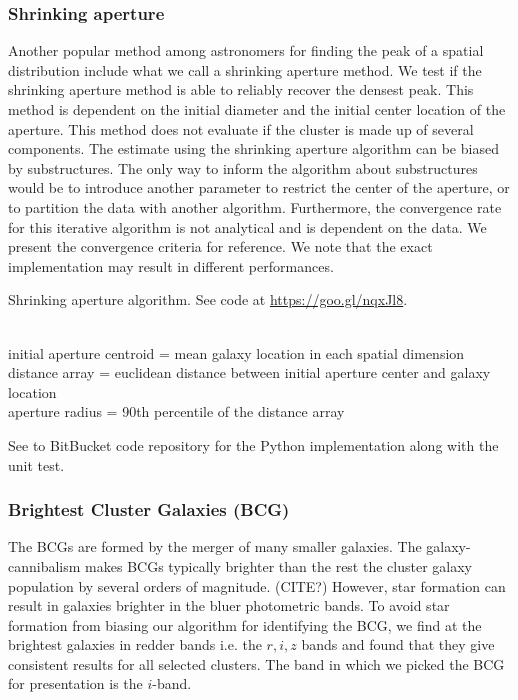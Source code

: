 \subsubsection{Shrinking aperture}
Another popular method among astronomers for finding the peak of a spatial
distribution include what we call a shrinking aperture method.
We test if the shrinking aperture method is able to reliably recover the 
densest peak.
This method is dependent on the initial diameter and the initial center 
location of the aperture.
This method does not evaluate if the cluster is made up of
several components.
The estimate using the shrinking aperture algorithm can be biased by
substructures. The only way to inform the algorithm about substructures would
be to introduce another parameter to restrict the center of the aperture, or to
partition the data with another algorithm.
Furthermore, the convergence rate for this iterative algorithm is not
analytical and is dependent on the data. We present the
convergence criteria for reference. 
We note that the exact implementation may result in different performances.
\begin{algorithm}
	\caption{Shrinking aperture algorithm. See code at
		\href{https://goo.gl/nqxJl8}{https://goo.gl/nqxJl8}.
	}
	 \hrulefill \\

	 initial aperture centroid = mean galaxy location in each spatial dimension\\
 	distance array = euclidean distance between initial aperture center and galaxy
	location \\
 	aperture radius = 90th percentile of the distance array\\ 
	   \hrulefill
 \end{algorithm}
 See to BitBucket code repository for the Python implementation
 along with the unit test.


\subsubsection{Brightest Cluster Galaxies (BCG)}
The BCGs are formed by the merger of many smaller
galaxies. The galaxy-cannibalism makes BCGs typically brighter than the rest 
the cluster galaxy population by several orders of magnitude. (CITE?)
However, star formation can result
in galaxies brighter in the bluer photometric bands.
To avoid star formation from biasing our algorithm for identifying the
BCG, we find at the brightest galaxies in redder bands i.e. the $r, i, z$
bands and found that they give consistent results for all selected clusters. 
The band in which we picked the BCG for presentation is the $i$-band. 

